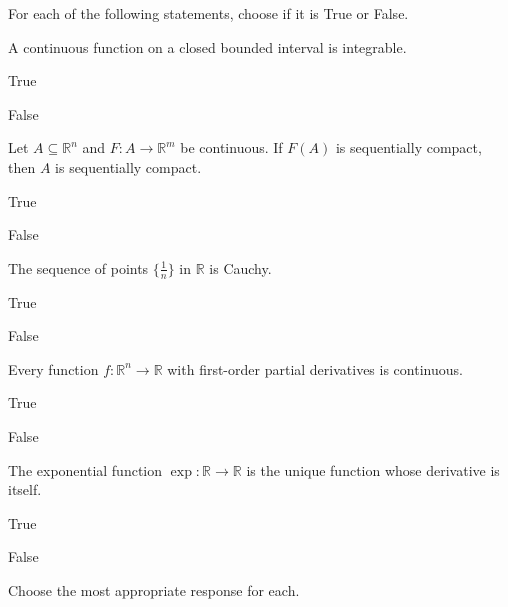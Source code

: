 \documentclass[12pt]{exam}
\newcommand{\<}{\langle}
\renewcommand{\>}{\rangle}
\begin{document}
\noindent
For each of the following statements, choose if it is True or False.
\bigskip
\begin{questions}

\question[1]
A continuous function on a closed bounded interval is integrable.
\begin{choices}
\item True
\item False
\end{choices}
\bigskip
\question[1]
Let \(A\subseteq\mathbb R^n\) and \(F:A\to\mathbb R^m\) be continuous.
If \(F(A)\) is sequentially compact, then \(A\) is sequentially compact.
\begin{choices}
\item True
\item False
\end{choices}
\bigskip
\question[1]
The sequence of points \(\{\frac{1}{n}\}\) in \(\mathbb R\) is Cauchy.
\begin{choices}
\item True
\item False
\end{choices}
\bigskip
\question[1]
Every function \(f:\mathbb R^n\to\mathbb R\)
with first-order partial derivatives is continuous.
\begin{choices}
\item True
\item False
\end{choices}
\bigskip
\question[1]
The exponential function \(\operatorname{exp}:\mathbb R\to\mathbb R\)
is the unique function whose derivative is itself.
\begin{choices}
\item True
\item False
\end{choices}

\newpage

Choose the most appropriate response for each.

\bigskip


\end{questions}
\end{document}

